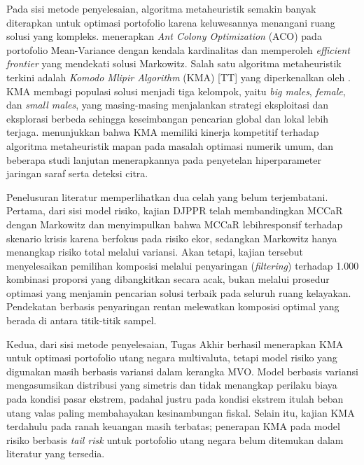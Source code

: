 Pada sisi metode penyelesaian, algoritma metaheuristik semakin banyak diterapkan untuk optimasi portofolio karena keluwesannya menangani ruang solusi yang kompleks.  menerapkan \textit{Ant Colony Optimization} (ACO) pada portofolio Mean-Variance dengan kendala kardinalitas dan memperoleh \textit{efficient frontier} yang mendekati solusi Markowitz. Salah satu algoritma metaheuristik terkini adalah \textit{Komodo Mlipir Algorithm} (KMA) [TT] yang diperkenalkan oleh . KMA membagi populasi solusi menjadi tiga kelompok, yaitu \textit{big males}, \textit{female}, dan \textit{small males}, yang masing-masing menjalankan strategi eksploitasi dan eksplorasi berbeda sehingga keseimbangan pencarian global dan lokal lebih terjaga.  menunjukkan bahwa KMA memiliki kinerja kompetitif terhadap algoritma metaheuristik mapan pada masalah optimasi numerik umum, dan beberapa studi lanjutan menerapkannya pada penyetelan hiperparameter jaringan saraf serta deteksi citra.



Penelusuran literatur memperlihatkan dua celah yang belum terjembatani. Pertama, dari sisi model risiko, kajian DJPPR  telah membandingkan MCCaR dengan Markowitz dan menyimpulkan bahwa MCCaR lebihresponsif terhadap skenario krisis karena berfokus pada risiko ekor, sedangkan Markowitz hanya menangkap risiko total melalui variansi. Akan tetapi, kajian tersebut menyelesaikan pemilihan komposisi melalui penyaringan (\textit{filtering}) terhadap 1.000 kombinasi proporsi yang dibangkitkan secara acak, bukan melalui prosedur optimasi yang menjamin pencarian solusi terbaik pada seluruh ruang kelayakan. Pendekatan berbasis penyaringan rentan melewatkan komposisi optimal yang berada di antara titik-titik sampel.

Kedua, dari sisi metode penyelesaian, Tugas Akhir  berhasil menerapkan KMA untuk optimasi portofolio utang negara multivaluta, tetapi model risiko yang digunakan masih berbasis variansi dalam kerangka MVO. Model berbasis variansi mengasumsikan distribusi yang simetris dan tidak menangkap perilaku biaya pada kondisi pasar ekstrem, padahal justru pada kondisi ekstrem itulah beban utang valas paling membahayakan kesinambungan fiskal. Selain itu, kajian KMA terdahulu pada ranah keuangan masih terbatas; penerapan KMA pada model risiko berbasis \textit{tail risk} untuk portofolio utang negara belum ditemukan dalam literatur yang tersedia.

